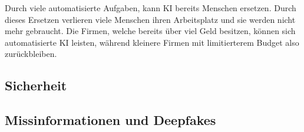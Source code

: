 \documentclass{report}
\begin{document}
Durch viele automatisierte Aufgaben, kann KI bereits Menschen ersetzen. Durch dieses Ersetzen verlieren viele Menschen ihren Arbeitsplatz und sie werden nicht mehr gebraucht. Die Firmen, welche bereits über viel Geld besitzen, können sich automatisierte KI leisten, während kleinere Firmen mit limitierterem Budget also zurückbleiben.

\subsection{Sicherheit}



\subsection{Missinformationen und Deepfakes}

\printbibliography
\end{document}
